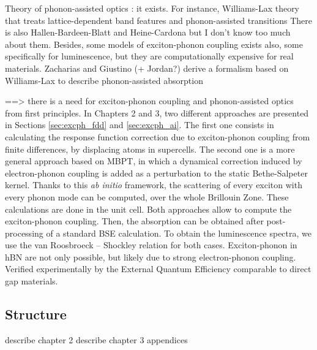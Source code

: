 Theory of phonon-assisted optics : it exists. For instance, Williams-Lax theory that treats lattice-dependent band features and phonon-assisted transitions 
There is also Hallen-Bardeen-Blatt and Heine-Cardona but I don't know too much about them.
Besides, some models of exciton-phonon coupling exists also, some specifically for luminescence, but they are computationally expensive for real materials.
Zacharias and Giustino (+ Jordan?) derive a formalism based on Williams-Lax to describe phonon-assisted absorption 

==> there is a need for exciton-phonon coupling and phonon-assisted optics from first principles. In Chapters 2 and 3, two different approaches are presented in Sections \ref{sec:excph_fdd} and \ref{sec:excph_ai}. The first one consists in calculating the response function correction due to exciton-phonon coupling from finite differences, by displacing atoms in supercells. The second one is a more general approach based on \acrshort{MBPT}, in which a dynamical correction induced by electron-phonon coupling is added as a perturbation to the static Bethe-Salpeter kernel. Thanks to this \textit{ab initio} framework, the scattering of every exciton with every phonon mode can be computed, over the whole Brillouin Zone. These calculations are done in the unit cell.
Both approaches allow to compute the exciton-phonon coupling. Then, the absorption can be obtained after post-processing of a standard \acrshort{BSE} calculation. To obtain the luminescence spectra, we use the van Roosbroeck -- Shockley relation for both cases.
Exciton-phonon in hBN are not only possible, but likely due to strong electron-phonon coupling. Verified experimentally by the External Quantum Efficiency comparable to direct gap materials.\\


\subsection{Structure}
describe chapter 2
describe chapter 3
appendices



